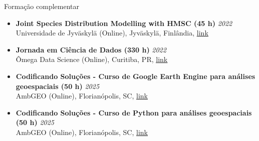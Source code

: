 \documentclass{resume}
\begin{document}
\begin{rSection}{Formação complementar}
\begin{itemize}
\item {\bf Joint Species Distribution Modelling with HMSC (45 h)} \hfill {\em 2022}\\
Universidade de Jyväskylä (Online), Jyväskylä, Finlândia, \href{https://www.helsinki.fi/en/researchgroups/statistical-ecology/software/hmsc}{\underline{link}}

\item {\bf Jornada em Ciência de Dados (330 h)} \hfill {\em 2022}\\
Ômega Data Science (Online), Curitiba, PR, \href{https://escola.omegadatascience.com.br}{\underline{link}}

\item {\bf Codificando Soluções - Curso de Google Earth Engine para análises geoespaciais (50 h)} \hfill {\em 2025}\\
AmbGEO (Online), Florianópolis, SC, \href{https://ambgeo.com/}{\underline{link}}

\item {\bf Codificando Soluções - Curso de Python para análises geoespaciais (50 h)} \hfill {\em 2025}\\
AmbGEO (Online), Florianópolis, SC, \href{https://ambgeo.com/}{\underline{link}}
\end{itemize} 

\end{rSection}

\end{document}
